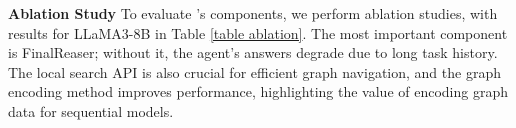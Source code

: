 


\textbf{Ablation Study} To evaluate \modelname's components, we perform ablation studies, with results for LLaMA3-8B in Table \ref{table ablation}. The most important component is FinalReaser; without it, the agent's answers degrade due to long task history. The local search API is also crucial for efficient graph navigation, and the graph encoding method improves performance, highlighting the value of encoding graph data for sequential models.

\begin{table*}[!h]
\centering
{}
\caption{Ablation Study of \modelname.}
\label{table ablation}
\vspace{-2mm}
\end{table*}


